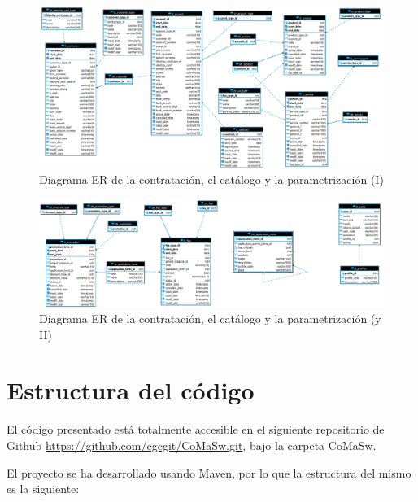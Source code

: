 \begin{landscape}

\begin{figure}[hp!]
  \centering
  \includegraphics[width=1\textwidth]{imaxes/er-instancia-01.png}          	  \caption{Diagrama ER de la contratación, el catálogo y la parametrización (I)}
  \label{fig:er-instancia-01}
\end{figure}

\begin{figure}[hp!]
  \centering
  \includegraphics[width=1\textwidth]{imaxes/er-instancia-02.png}
  \caption{Diagrama ER de la contratación, el catálogo y la parametrización (y II)}
  \label{fig:er-instancia-02}
\end{figure}


\end{landscape}


\section{Estructura del código}
\label{chap:estructuraCodigo}

El código presentado está totalmente accesible en el siguiente repositorio de Github \url{https://github.com/cgcgit/CoMaSw.git}, bajo la carpeta CoMaSw.

El proyecto se ha desarrollado usando Maven, por lo que la estructura del mismo es la siguiente:



